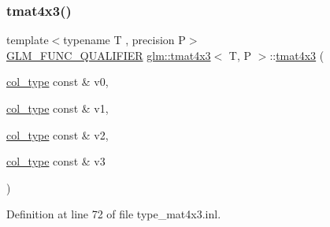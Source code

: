 \subsubsection{\texorpdfstring{tmat4x3()}{tmat4x3()}\hspace{0.1cm}{\footnotesize\ttfamily [7/22]}}
{\footnotesize\ttfamily template$<$typename T , precision P$>$ \\
\mbox{\hyperlink{setup_8hpp_a33fdea6f91c5f834105f7415e2a64407}{G\+L\+M\+\_\+\+F\+U\+N\+C\+\_\+\+Q\+U\+A\+L\+I\+F\+I\+ER}} \mbox{\hyperlink{structglm_1_1tmat4x3}{glm\+::tmat4x3}}$<$ T, P $>$\+::\mbox{\hyperlink{structglm_1_1tmat4x3}{tmat4x3}} (\begin{DoxyParamCaption}\item[{\mbox{\hyperlink{structglm_1_1tmat4x3_ac64f78f27c32014f7d72233969526430}{col\+\_\+type}} const \&}]{v0,  }\item[{\mbox{\hyperlink{structglm_1_1tmat4x3_ac64f78f27c32014f7d72233969526430}{col\+\_\+type}} const \&}]{v1,  }\item[{\mbox{\hyperlink{structglm_1_1tmat4x3_ac64f78f27c32014f7d72233969526430}{col\+\_\+type}} const \&}]{v2,  }\item[{\mbox{\hyperlink{structglm_1_1tmat4x3_ac64f78f27c32014f7d72233969526430}{col\+\_\+type}} const \&}]{v3 }\end{DoxyParamCaption})}



Definition at line 72 of file type\+\_\+mat4x3.\+inl.

\mbox{\label{structglm_1_1tmat4x3_a6374ec605f3a745bec999d9dd6926a8d}} 
